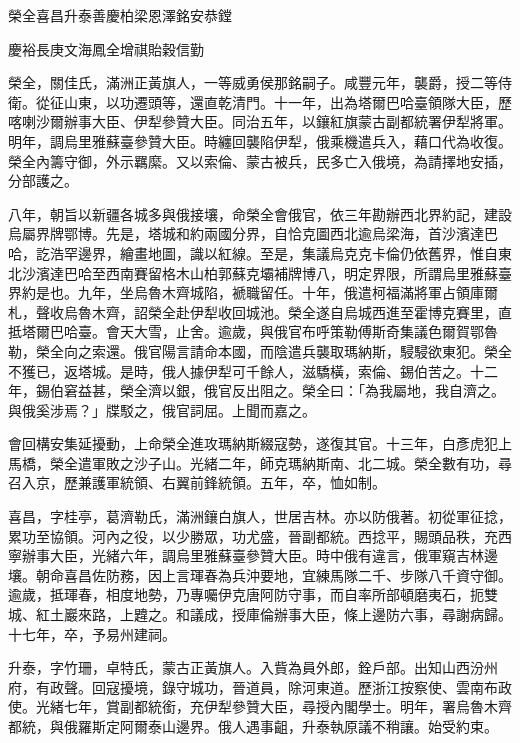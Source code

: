 
\begin{pinyinscope}
榮全喜昌升泰善慶柏梁恩澤銘安恭鏜

慶裕長庚文海鳳全增祺貽穀信勤

榮全，關佳氏，滿洲正黃旗人，一等威勇侯那銘嗣子。咸豐元年，襲爵，授二等侍衛。從征山東，以功遷頭等，還直乾清門。十一年，出為塔爾巴哈臺領隊大臣，歷喀喇沙爾辦事大臣、伊犁參贊大臣。同治五年，以鑲紅旗蒙古副都統署伊犁將軍。明年，調烏里雅蘇臺參贊大臣。時纏回襲陷伊犁，俄乘機遣兵入，藉口代為收復。榮全內籌守御，外示羈縻。又以索倫、蒙古被兵，民多亡入俄境，為請擇地安插，分部護之。

八年，朝旨以新疆各城多與俄接壤，命榮全會俄官，依三年勘辦西北界約記，建設烏屬界牌鄂博。先是，塔城和約兩國分界，自恰克圖西北逾烏梁海，首沙濱達巴哈，訖浩罕邊界，繪畫地圖，識以紅線。至是，集議烏克克卡倫仍依舊界，惟自東北沙濱達巴哈至西南賽留格木山柏郭蘇克壩補牌博八，明定界限，所謂烏里雅蘇臺界約是也。九年，坐烏魯木齊城陷，褫職留任。十年，俄遣柯福滿將軍占領庫爾札，聲收烏魯木齊，詔榮全赴伊犁收回城池。榮全遂自烏城西進至霍博克賽里，直抵塔爾巴哈臺。會天大雪，止舍。逾歲，與俄官布呼策勒傅斯奇集議色爾賀鄂魯勒，榮全向之索還。俄官陽言請命本國，而陰遣兵襲取瑪納斯，駸駸欲東犯。榮全不獲已，返塔城。是時，俄人據伊犁可千餘人，滋驕橫，索倫、錫伯苦之。十二年，錫伯窘益甚，榮全濟以銀，俄官反出阻之。榮全曰：「為我屬地，我自濟之。與俄奚涉焉？」牒駁之，俄官詞屈。上聞而嘉之。

會回構安集延擾動，上命榮全進攻瑪納斯綴寇勢，遂復其官。十三年，白彥虎犯上馬橋，榮全遣軍敗之沙子山。光緒二年，師克瑪納斯南、北二城。榮全數有功，尋召入京，歷兼護軍統領、右翼前鋒統領。五年，卒，恤如制。

喜昌，字桂亭，葛濟勒氏，滿洲鑲白旗人，世居吉林。亦以防俄著。初從軍征捻，累功至協領。河內之役，以少勝眾，功尤盛，晉副都統。西捻平，賜頭品秩，充西寧辦事大臣，光緒六年，調烏里雅蘇臺參贊大臣。時中俄有違言，俄軍窺吉林邊壤。朝命喜昌佐防務，因上言琿春為兵沖要地，宜練馬隊二千、步隊八千資守御。逾歲，抵琿春，相度地勢，乃專囑伊克唐阿防守事，而自率所部頓磨夷石，扼雙城、紅土巖來路，上韙之。和議成，授庫倫辦事大臣，條上邊防六事，尋謝病歸。十七年，卒，予易州建祠。

升泰，字竹珊，卓特氏，蒙古正黃旗人。入貲為員外郎，銓戶部。出知山西汾州府，有政聲。回寇擾境，錄守城功，晉道員，除河東道。歷浙江按察使、雲南布政使。光緒七年，賞副都統銜，充伊犁參贊大臣，尋授內閣學士。明年，署烏魯木齊都統，與俄羅斯定阿爾泰山邊界。俄人遇事齟，升泰執原議不稍讓。始受約束。


\end{pinyinscope}
